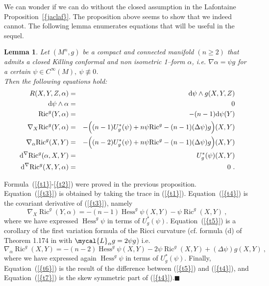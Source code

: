 \documentclass[a4paper,11pt,leqno]{amsart}
\numberwithin{equation}{section}
\theoremstyle{main}
\newtheorem{lem} [thm] {\bf  Lemma}
\begin{document}
We can wonder if we can do without the closed assumption in the Lafontaine Proposition~{\ref{{jaclaf}}}. The proposition above seems to show that we indeed cannot. The following lemma enumerates equations that will be useful in the sequel.
\begin{lem}\label{lem1}
Let $(M^n, g)$ be a compact and connected manifold $(n\ge 2)$ that admits a closed Killing conformal and non isometric 1--form $\alpha$, i.e. $ \nabla \alpha= \psi g $  for a certain $\psi\in C^{\infty}(M),\ {\psi \not\equiv 0}$. \\
Then the following equations hold:
\begin{eqnarray}
	\label{t1} R(X,Y,Z,\alpha)&=&  {{\rm d}} \psi \wedge g(X,Y,Z) \\
	\label{t2} {{\rm d}} \psi \wedge \alpha &=&0 \\
	\label{t3} {\operatorname{Ric}}^g (Y,\alpha)&=& -(n-1) {{\rm d}} \psi(Y)\\
	\label{t4} \nabla_X {\operatorname{Ric}}^g (Y,\alpha)&=& -\Big( (n-1)U_g^* (\psi)  +n\psi{\operatorname{Ric}}^g -(n-1)(\Delta \psi) g\Big)(X,Y) \\
	\label{t5} \nabla_\alpha {\operatorname{Ric}}^g(X,Y) &=& -\Big((n-2)U_g^* (\psi) + n\psi {\operatorname{Ric}}^g -(n-1)(\Delta \psi) g\Big)(X,Y)\\
	\label{t6} {{\rm d}} ^\nabla {\operatorname{Ric}}^g (\alpha,X,Y)&=& U_g^*(\psi)(X,Y) \\ 
	\label{t7} {{\rm d}} ^\nabla {\operatorname{Ric}}^g (X,Y,\alpha)&=& 0 \ .
\end{eqnarray}
\end{lem}
\proof Formula~({\ref{{t1}}}-{\ref{{t2}}})  were proved in the previous proposition. Equation~({\ref{{t3}}}) is obtained by taking the trace in ({\ref{{t1}}}). Equation~({\ref{{t4}}}) is the covariant derivative of ({\ref{{t3}}}), namely 
$$\nabla_X {\operatorname{Ric}}^g (Y,\alpha)= -(n-1) {\operatorname{Hess}}^g \psi(X,Y) -\psi{\operatorname{Ric}}^g (X,Y) \ ,$$
where we have expressed ${\operatorname{Hess}}^g \psi$ in terms of $U_g^*(\psi)$. Equation~({\ref{{t5}}}) is a corollary of the first variation formula of the Ricci curvature (cf. formula (d) of Theorem 1.174 in \cite{Besse} with $\mycal{L}_\alpha g = 2\psi g$) i.e.
$$ \nabla_\alpha {\operatorname{Ric}}^g (X,Y)= -(n-2){\operatorname{Hess}}^g \psi(X,Y) - 2\psi {\operatorname{Ric}}^g (X,Y) + (\Delta \psi)g(X,Y) \ ,$$
where we have expressed again ${\operatorname{Hess}}^g \psi$ in terms of $U_g^*(\psi)$. Finally, Equation~({\ref{{t6}}}) is the result of the difference between ({\ref{{t5}}}) and ({\ref{{t4}}}), and Equation~({\ref{{t7}}}) is the skew symmetric part of ({\ref{{t4}}}).{\hfill $\blacksquare$ \medskip \\}
\end{document}
